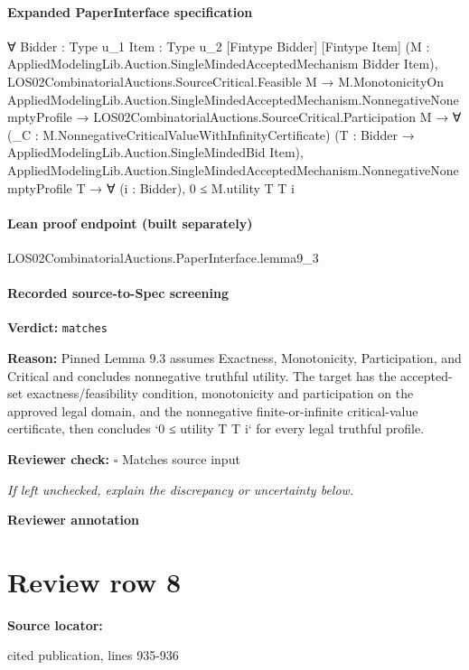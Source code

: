 \documentclass[10pt]{article}
\newcommand{\reviewerbox}{%
  \par\noindent\fbox{\parbox{0.96\linewidth}{\rule{0pt}{0.38in}}}\par
}
\newcommand{\reviewmatch}[1]{%
  \par\noindent\textbf{Reviewer check:} $\square$\; #1\par
  \noindent\emph{If left unchecked, explain the discrepancy or uncertainty below.}\par
}
\begin{document}
\paragraph{Expanded PaperInterface specification}
\begin{ReviewVerbatim}
∀ {Bidder : Type u_1} {Item : Type u_2} [Fintype Bidder] [Fintype Item]
  (M : AppliedModelingLib.Auction.SingleMindedAcceptedMechanism Bidder Item),
  LOS02CombinatorialAuctions.SourceCritical.Feasible M →
    M.MonotonicityOn AppliedModelingLib.Auction.SingleMindedAcceptedMechanism.NonnegativeNonemptyProfile →
      LOS02CombinatorialAuctions.SourceCritical.Participation M →
        ∀ (_C : M.NonnegativeCriticalValueWithInfinityCertificate)
          (T : Bidder → AppliedModelingLib.Auction.SingleMindedBid Item),
          AppliedModelingLib.Auction.SingleMindedAcceptedMechanism.NonnegativeNonemptyProfile T →
            ∀ (i : Bidder), 0 ≤ M.utility T T i
\end{ReviewVerbatim}



\paragraph{Lean proof endpoint (built separately)}\begin{ReviewVerbatim}
LOS02CombinatorialAuctions.PaperInterface.lemma9_3
\end{ReviewVerbatim}

\paragraph{Recorded source-to-Spec screening}
\textbf{Verdict:} \texttt{matches}
\\
{\raggedright
\textbf{Reason:} Pinned Lemma 9.\allowbreak{}3 assumes Exactness, Monotonicity, Participation, and Critical and concludes nonnegative truthful utility.\allowbreak{} The target has the accepted-\allowbreak{}set exactness/\allowbreak{}feasibility condition, monotonicity and participation on the approved legal domain, and the nonnegative finite-\allowbreak{}or-\allowbreak{}infinite critical-\allowbreak{}value certificate, then concludes `0 ≤ utility T T i` for every legal truthful profile.\allowbreak{}
\par}
\reviewmatch{Matches source input}
\noindent\textbf{Reviewer annotation}\par
\reviewerbox
\clearpage
\hypertarget{source-claim-dbe1034051a02557}{}
\section*{Review row 8}
\textbf{Source locator:} {\footnotesize\raggedright cited publication, lines 935-\allowbreak{}936\par}
\end{document}
